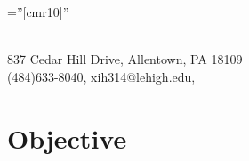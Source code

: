 \documentclass[a4paper,11pt]{article} %
\newcommand{\MYhref}[3][blue]{\href{#2}{\color{#1}{#3}}}%
\begin{document}
\pagestyle{empty} %

\font\fb=''[cmr10]'' %



\\
837 Cedar Hill Drive, Allentown, PA 18109\\(484)633-8040, {xih314@lehigh.edu}, \MYhref{www.xihey.com}{www.xihey.com}




\section{Objective}
\end{document}
